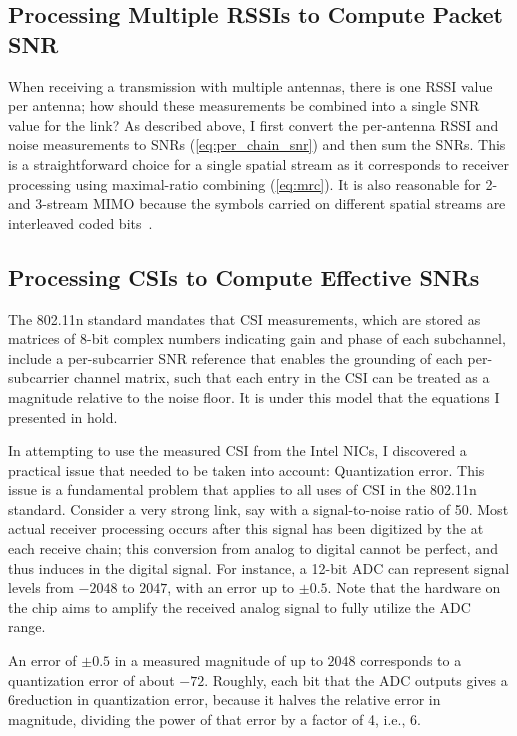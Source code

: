 \subsection{Processing Multiple RSSIs to Compute Packet SNR}
\label{sec:rssi_sum}
When receiving a transmission with multiple antennas, there is one RSSI value per antenna; how should these measurements be combined into a single SNR value for the link? As described above, I first convert the per-antenna RSSI and noise measurements to SNRs (\eqref{eq:per_chain_snr}) and then sum the SNRs. This is a straightforward choice for a single spatial stream as it corresponds to receiver processing using maximal-ratio combining (\eqref{eq:mrc}). It is also reasonable for 2- and 3-stream MIMO because the symbols carried on different spatial streams are interleaved coded bits~\cite{80211n}.

\subsection{Processing CSIs to Compute Effective SNRs}
The 802.11n standard mandates that CSI measurements, which are stored as matrices of 8-bit complex numbers indicating gain and phase of each subchannel, include a per-subcarrier SNR reference that enables the grounding of each per-subcarrier channel matrix, such that each entry in the CSI can be treated as a magnitude relative to the noise floor. It is under this model that the equations I presented in  hold.

In attempting to use the measured CSI from the Intel NICs, I discovered a practical issue that needed to be taken into account: Quantization error. This issue is a fundamental problem that applies to all uses of CSI in the 802.11n standard. Consider a very strong link, say with a signal-to-noise ratio of 50\dB. Most actual receiver processing occurs after this signal has been digitized by the  at each receive chain; this conversion from analog to digital cannot be perfect, and thus induces  in the digital signal. For instance, a 12-bit ADC can represent signal levels from $-2048$ to $2047$, with an error up to $\pm0.5$. Note that the  hardware on the chip aims to amplify the received analog signal to fully utilize the ADC range.

An error of $\pm0.5$ in a measured magnitude of up to $2048$ corresponds to a quantization error of about $-72$\dB. Roughly, each bit that the ADC outputs gives a 6\dB reduction in quantization error, because it halves the relative error in magnitude, dividing the power of that error by a factor of 4, i.e., 6\dB.

